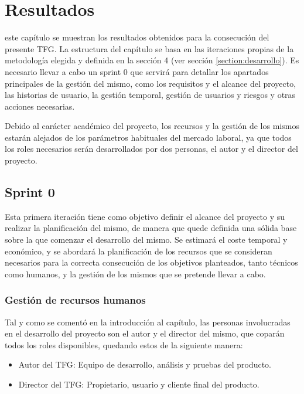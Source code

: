 \chapter{Resultados}
\label{chap:resultados}



 este capítulo se muestran los resultados obtenidos para la consecución del presente \ac{TFG}. La estructura del capítulo se basa en las iteraciones propias de la metodología elegida y definida en la sección 4 (ver sección \ref{section:desarrollo}). Es necesario llevar a cabo un sprint 0 que servirá para detallar los apartados principales de la gestión del mismo, como los requisitos y el alcance del proyecto, las historias de usuario, la gestión temporal, gestión de usuarios y riesgos y otras acciones necesarias.

Debido al carácter académico del proyecto, los recursos y la gestión de los mismos estarán alejados de los parámetros habituales del mercado laboral, ya que todos los roles necesarios serán desarrollados por dos personas, el autor y el director del proyecto.

\section{Sprint 0}
Esta primera iteración tiene como objetivo definir el alcance del proyecto y su realizar la planificación del mismo, de manera que quede definida una sólida base sobre la que comenzar el desarrollo del mismo. Se estimará el coste temporal y económico, y se abordará la planificación de los recursos que se consideran necesarios para la correcta consecución de los objetivos planteados, tanto técnicos como humanos, y la gestión de los mismos que se pretende llevar a cabo.

	\subsection{Gestión de recursos humanos}
	Tal y como se comentó en la introducción al capítulo, las personas involucradas en el desarrollo del proyecto son el autor y el director del mismo, que coparán todos los roles disponibles, quedando estos de la siguiente manera:
	
	\begin{itemize}[label={$\bullet$},labelindent=\parindent,leftmargin=2cm]
		\item Autor del \ac{TFG}: Equipo de desarrollo, análisis y pruebas del producto.
		\item Director del \ac{TFG}: Propietario, usuario y cliente final del producto.
	\end{itemize}
	
